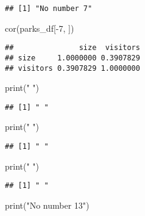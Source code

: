 \documentclass[
]{article}
\newenvironment{Shaded}{\begin{snugshade}}{\end{snugshade}}
\newcommand{\DecValTok}[1]{\textcolor[rgb]{0.00,0.00,0.81}{#1}}
\newcommand{\FunctionTok}[1]{\textcolor[rgb]{0.00,0.00,0.00}{#1}}
\newcommand{\NormalTok}[1]{#1}
\newcommand{\SpecialCharTok}[1]{\textcolor[rgb]{0.00,0.00,0.00}{#1}}
\newcommand{\StringTok}[1]{\textcolor[rgb]{0.31,0.60,0.02}{#1}}
\begin{document}
\begin{verbatim}
## [1] "No number 7"
\end{verbatim}

\begin{Shaded}
\begin{Highlighting}[]
\FunctionTok{cor}\NormalTok{(parks\_df[}\SpecialCharTok{{-}}\DecValTok{7}\NormalTok{, ])}
\end{Highlighting}
\end{Shaded}

\begin{verbatim}
##               size  visitors
## size     1.0000000 0.3907829
## visitors 0.3907829 1.0000000
\end{verbatim}

\begin{Shaded}
\begin{Highlighting}[]
\FunctionTok{print}\NormalTok{(}\StringTok{" "}\NormalTok{)}
\end{Highlighting}
\end{Shaded}

\begin{verbatim}
## [1] " "
\end{verbatim}

\begin{Shaded}
\begin{Highlighting}[]
\FunctionTok{print}\NormalTok{(}\StringTok{" "}\NormalTok{)}
\end{Highlighting}
\end{Shaded}

\begin{verbatim}
## [1] " "
\end{verbatim}

\begin{Shaded}
\begin{Highlighting}[]
\FunctionTok{print}\NormalTok{(}\StringTok{" "}\NormalTok{)}
\end{Highlighting}
\end{Shaded}

\begin{verbatim}
## [1] " "
\end{verbatim}

\begin{Shaded}
\begin{Highlighting}[]
\FunctionTok{print}\NormalTok{(}\StringTok{"No number 13"}\NormalTok{)}
\end{Highlighting}
\end{Shaded}
\end{document}
